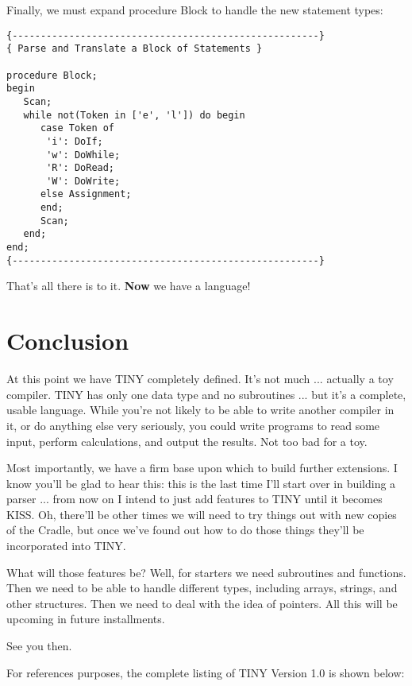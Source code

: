 Finally, we  must  expand  procedure  Block  to  handle the  new statement types:

\begin{verbatim}
{------------------------------------------------------}
{ Parse and Translate a Block of Statements }

procedure Block;
begin
   Scan;
   while not(Token in ['e', 'l']) do begin
      case Token of
       'i': DoIf;
       'w': DoWhile;
       'R': DoRead;
       'W': DoWrite;
      else Assignment;
      end;
      Scan;
   end;
end;
{------------------------------------------------------}
\end{verbatim}

That's all there is to it. {\bfseries Now} we have a language!

\section{Conclusion}

At this point we have TINY completely defined. It's not much ... actually a toy  compiler. TINY  has  only one data type and no subroutines  ... but it's a complete, usable  language. While you're not likely to be able to write another compiler in  it, or do anything else very seriously, you could write programs to read some input, perform calculations, and  output  the results. Not too bad for a toy.

Most importantly, we have a firm base upon which to build further extensions. I know you'll be glad to hear this: this is the last time  I'll  start  over in building a parser ... from  now  on  I intend to just add features to  TINY  until it becomes KISS. Oh, there'll be other times we will  need  to try things out with new copies  of  the  Cradle, but once we've found out how to do those things they'll be incorporated into TINY.

What  will  those  features  be?    Well, for starters  we  need subroutines and functions. Then  we  need to be able to handle different types, including arrays, strings, and other structures. Then we need to deal with the idea of pointers. All this will be upcoming in future installments.

See you then.

For references purposes, the complete listing of TINY Version 1.0 is shown below:

